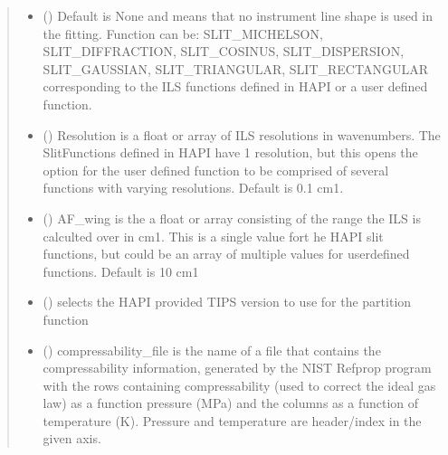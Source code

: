 \documentclass[letterpaper,10pt,english]{sphinxmanual}
\begin{document}
\begin{fulllineitems}
\begin{quote}
\begin{description}
\begin{itemize}
\item {} 
\sphinxAtStartPar
{} (\sphinxstyleliteralemphasis{\sphinxupquote{, }}) \textendash{} Default is None and means that no instrument line shape is used in the fitting.
Function can be: SLIT\_MICHELSON, SLIT\_DIFFRACTION, SLIT\_COSINUS, SLIT\_DISPERSION, SLIT\_GAUSSIAN, SLIT\_TRIANGULAR, SLIT\_RECTANGULAR corresponding to the ILS functions defined in HAPI or a user defined function.

\item {} 
\sphinxAtStartPar
{} (\sphinxstyleliteralemphasis{\sphinxupquote{, }}) \textendash{} Resolution is a float or array of ILS resolutions in wavenumbers.  The SlitFunctions defined in HAPI have 1 resolution, but this opens the option for the user defined function to be comprised of several functions with varying resolutions.  Default is 0.1 cm\sphinxhyphen{}1.

\item {} 
\sphinxAtStartPar
{} (\sphinxstyleliteralemphasis{\sphinxupquote{, }}) \textendash{} AF\_wing is the a float or array consisting of the range the ILS is calculted over in cm\sphinxhyphen{}1.  This is a single value fort he HAPI slit functions, but could be an array of multiple values for user\sphinxhyphen{}defined functions.  Default is 10 cm\sphinxhyphen{}1

\item {} 
\sphinxAtStartPar
{} (\sphinxstyleliteralemphasis{\sphinxupquote{, }}) \textendash{} selects the HAPI provided TIPS version to use for the partition function

\item {} 
\sphinxAtStartPar
{} (\sphinxstyleliteralemphasis{\sphinxupquote{, }}) \textendash{} compressability\_file is the name of a file that contains the compressability information, generated by the NIST Refprop program with the rows containing compressability (used to correct the ideal gas law) as a function pressure (MPa) and the columns as a function of temperature (K).  Pressure and temperature are header/index in the given axis.


\end{itemize}
\end{description}
\end{quote}
\end{fulllineitems}
\end{document}
